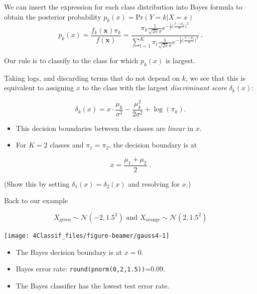 \documentclass[10pt,ignorenonframetext,]{beamer}
\begin{document}
\begin{frame}

We can insert the expression for each class distribution into Bayes
formula to obtain the posterior probability
\(p_k(x) = \text{Pr}(Y = k | X = x)\)
\[p_k(x) = \frac{f_k({\boldsymbol x}) \pi_k}{f({\boldsymbol x})}=\frac{\pi_k \frac{1}{\sqrt{2\pi}\sigma} e^{-\frac{1}{2}\big(\frac{x-\mu_k}{\sigma}\big)^2}}{\sum_{l=1}^K \pi_l \frac{1}{\sqrt{2\pi}\sigma} e^{-\frac{1}{2}\big(\frac{x-\mu_l}{\sigma}\big)^2}} \ .\]

Our rule is to classify to the class for which \(p_k(x)\) is largest.

\end{frame}

\begin{frame}

Taking logs, and discarding terms that do not depend on \(k\), we see
that this is equivalent to assigning \(x\) to the class with the largest
\emph{discriminant score} \(\delta_k(x)\):

\[\delta_k(x) = x\cdot \frac{\mu_k}{\sigma^2} - \frac{\mu_k^2}{2 \sigma^2}+\log(\pi_k).\]

\begin{itemize}
\item
  This decision boundaries between the classes are \emph{linear} in
  \(x\).
\item
  For \(K=2\) classes and \(\pi_1=\pi_2\), the decision boundary is at
\end{itemize}

\[x = \frac{\mu_1+ \mu_2}{2} \ .\]

(Show this by setting \(\delta_1(x)=\delta_2(x)\) and resolving for
\(x\).)

\end{frame}

\begin{frame}[fragile]

\begin{block}{Back to our example}

\[X_{\text{green}}\sim \mathcal{N}(-2, 1.5^2) \text{ and }
X_{\text{orange}}\sim \mathcal{N}(2, 1.5^2) \]

\begin{center}\texttt{[image: 4Classif\_files/figure-beamer/gauss4-1]} \end{center}

\begin{itemize}
\item
  The Bayes decision boundary is at \(x=0\).
\item
  Bayes error rate: \texttt{round(pnorm(0,2,1.5))}=0.09.
\item
  The Bayes classifier has the lowest test error rate.
\end{itemize}

\end{block}

\end{frame}
\end{document}
